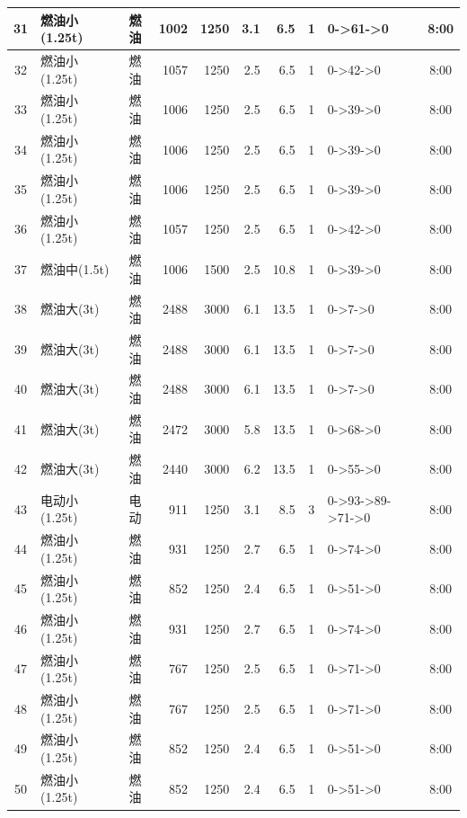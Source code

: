 \begin{landscape}
\begin{longtable}{|c|l|c|r|r|r|r|c|p{2.8cm}|c|}
\hline
\rowcolor{gray!8}
31 & 燃油小(1.25t) & 燃油 & 1002 & 1250 & 3.1 & 6.5 & 1 & 0->61->0 & 8:00 \\
\hline
32 & 燃油小(1.25t) & 燃油 & 1057 & 1250 & 2.5 & 6.5 & 1 & 0->42->0 & 8:00 \\
\hline
\rowcolor{gray!8}
33 & 燃油小(1.25t) & 燃油 & 1006 & 1250 & 2.5 & 6.5 & 1 & 0->39->0 & 8:00 \\
\hline
34 & 燃油小(1.25t) & 燃油 & 1006 & 1250 & 2.5 & 6.5 & 1 & 0->39->0 & 8:00 \\
\hline
\rowcolor{gray!8}
35 & 燃油小(1.25t) & 燃油 & 1006 & 1250 & 2.5 & 6.5 & 1 & 0->39->0 & 8:00 \\
\hline
36 & 燃油小(1.25t) & 燃油 & 1057 & 1250 & 2.5 & 6.5 & 1 & 0->42->0 & 8:00 \\
\hline
\rowcolor{gray!8}
37 & 燃油中(1.5t) & 燃油 & 1006 & 1500 & 2.5 & 10.8 & 1 & 0->39->0 & 8:00 \\
\hline
38 & 燃油大(3t) & 燃油 & 2488 & 3000 & 6.1 & 13.5 & 1 & 0->7->0 & 8:00 \\
\hline
\rowcolor{gray!8}
39 & 燃油大(3t) & 燃油 & 2488 & 3000 & 6.1 & 13.5 & 1 & 0->7->0 & 8:00 \\
\hline
40 & 燃油大(3t) & 燃油 & 2488 & 3000 & 6.1 & 13.5 & 1 & 0->7->0 & 8:00 \\
\hline
\rowcolor{gray!8}
41 & 燃油大(3t) & 燃油 & 2472 & 3000 & 5.8 & 13.5 & 1 & 0->68->0 & 8:00 \\
\hline
42 & 燃油大(3t) & 燃油 & 2440 & 3000 & 6.2 & 13.5 & 1 & 0->55->0 & 8:00 \\
\hline
\rowcolor{gray!8}
43 & 电动小(1.25t) & 电动 & 911 & 1250 & 3.1 & 8.5 & 3 & 0->93->89->71->0 & 8:00 \\
\hline
44 & 燃油小(1.25t) & 燃油 & 931 & 1250 & 2.7 & 6.5 & 1 & 0->74->0 & 8:00 \\
\hline
\rowcolor{gray!8}
45 & 燃油小(1.25t) & 燃油 & 852 & 1250 & 2.4 & 6.5 & 1 & 0->51->0 & 8:00 \\
\hline
46 & 燃油小(1.25t) & 燃油 & 931 & 1250 & 2.7 & 6.5 & 1 & 0->74->0 & 8:00 \\
\hline
\rowcolor{gray!8}
47 & 燃油小(1.25t) & 燃油 & 767 & 1250 & 2.5 & 6.5 & 1 & 0->71->0 & 8:00 \\
\hline
48 & 燃油小(1.25t) & 燃油 & 767 & 1250 & 2.5 & 6.5 & 1 & 0->71->0 & 8:00 \\
\hline
\rowcolor{gray!8}
49 & 燃油小(1.25t) & 燃油 & 852 & 1250 & 2.4 & 6.5 & 1 & 0->51->0 & 8:00 \\
\hline
50 & 燃油小(1.25t) & 燃油 & 852 & 1250 & 2.4 & 6.5 & 1 & 0->51->0 & 8:00 \\

\end{longtable}
\end{landscape}
